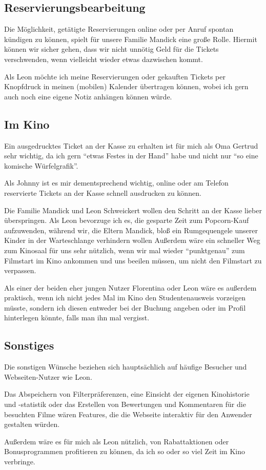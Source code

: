 \subsection{Reservierungsbearbeitung}
Die Möglichkeit, getätigte Reservierungen online oder per Anruf spontan kündigen zu können, spielt für unsere Familie Mandick eine große Rolle.
Hiermit können wir sicher gehen, dass wir nicht unnötig Geld für die Tickets verschwenden, wenn vielleicht wieder etwas dazwischen kommt.

Als Leon möchte ich meine Reservierungen oder gekauften Tickets per Knopfdruck in meinen (mobilen) Kalender übertragen können, wobei ich gern auch noch eine eigene Notiz anhängen können würde.

\subsection{Im Kino}
Ein ausgedrucktes Ticket an der Kasse zu erhalten ist für mich als Oma Gertrud sehr wichtig, da ich gern \enquote{etwas Festes in der Hand} habe und nicht nur \enquote{so eine komische Würfelgrafik}.

Als Johnny ist es mir dementsprechend wichtig, online oder am Telefon reservierte Tickets an der Kasse schnell ausdrucken zu können.

Die Familie Mandick und Leon Schweickert wollen den Schritt an der Kasse lieber überspringen.
Als Leon bevorzuge ich es, die gesparte Zeit zum Popcorn-Kauf aufzuwenden, während wir, die Eltern Mandick, bloß ein Rumgequengele unserer Kinder in der Warteschlange verhindern wollen
Außerdem wäre ein schneller Weg zum Kinosaal für uns sehr nützlich, wenn wir mal wieder \enquote{punktgenau} zum Filmstart im Kino ankommen und uns beeilen müssen, um nicht den Filmstart zu verpassen.

Als einer der beiden eher jungen Nutzer Florentina oder Leon wäre es außerdem praktisch, wenn ich nicht jedes Mal im Kino den Studentenausweis vorzeigen müsste, sondern ich diesen entweder bei der Buchung angeben oder im Profil hinterlegen könnte, falls man ihn mal vergisst.

\subsection{Sonstiges}
Die sonstigen Wünsche beziehen sich hauptsächlich auf häufige Besucher und Webseiten-Nutzer wie Leon.

Das Abspeichern von Filterpräferenzen, eine Einsicht der eigenen Kinohistorie und -statistik oder das Erstellen von Bewertungen und Kommentaren für die besuchten Filme wären Features, die die Webseite interaktiv für den Anwender gestalten würden.

Außerdem wäre es für mich als Leon nützlich, von Rabattaktionen oder Bonusprogrammen profitieren zu können, da ich so oder so viel Zeit im Kino verbringe.
